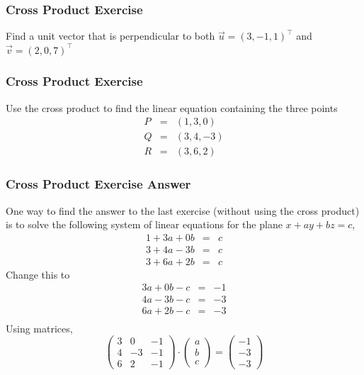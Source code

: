 \documentclass[xcolor=dvipsnames]{beamer}
\begin{document}
\begin{frame}
  \frametitle{Cross Product Exercise}
  {\ubung} Find a unit vector that is perpendicular to both
  $\vec{u}=(3,-1,1)^{\intercal}$ and $\vec{v}=(2,0,7)^{\intercal}$
\end{frame}

\begin{frame}
  \frametitle{Cross Product Exercise}
  {\ubung} Use the cross product to find the linear equation containing the
  three points
  \begin{equation}
    \label{eq:eiyeigaz}
    \begin{array}{rcl}
      P&=&(1,3,0) \\
      Q&=&(3,4,-3) \\
      R&=&(3,6,2)
    \end{array}
  \end{equation}
\end{frame}

\begin{frame}
  \frametitle{Cross Product Exercise Answer}
One way to find the answer to the last exercise (without using the
cross product) is to solve the following system of linear equations
for the plane $x+ay+bz=c$,
\begin{equation}
  \label{eq:yohghaef}
  \begin{array}{rcl}
    1+3a+0b&=&c \\
    3+4a-3b&=&c \\
    3+6a+2b&=&c
  \end{array}
\end{equation}
Change this to
\begin{equation}
  \label{eq:oxeingiu}
  \begin{array}{rcl}
    3a+0b-c&=&-1 \\
    4a-3b-c&=&-3 \\
    6a+2b-c&=&-3 \\
  \end{array}
\end{equation}
Using matrices,
\begin{equation}
  \label{eq:ukohjiej}
  \left(
    \begin{array}{ccc}
      3&0&-1 \\
      4&-3&-1 \\
      6&2&-1
    \end{array}\right)\cdot\left(
    \begin{array}{c}
      a \\
      b \\
      c
    \end{array}\right)=\left(
    \begin{array}{c}
      -1 \\
      -3 \\
      -3
    \end{array}\right)
\end{equation}
\end{frame}
\end{document}

